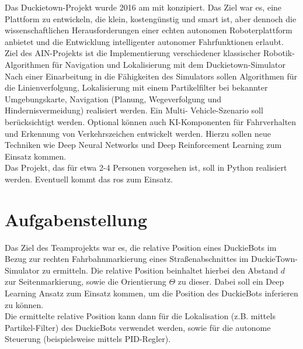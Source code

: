 Das Duckietown-Projekt wurde 2016 am \acf{mit} konzipiert. Das Ziel war es, eine Plattform zu
entwickeln, die klein, kostengünstig und \grqq smart\grqq{} ist, aber dennoch die wissenschaftlichen
Herausforderungen einer echten autonomen Roboterplattform anbietet und die Entwicklung
intelligenter autonomer Fahrfunktionen erlaubt. \cite{duckietown}\\

\noindent Ziel des AIN-Projekts ist die Implementierung verschiedener klassischer Robotik-Algorithmen
für Navigation und Lokalisierung mit dem Duckietown-Simulator\\

\noindent Nach einer Einarbeitung in die Fähigkeiten des Simulators sollen Algorithmen für die
Linienverfolgung, Lokalisierung mit einem Partikelfilter bei bekannter Umgebungskarte,
Navigation (Planung, Wegeverfolgung und Hindernisvermeidung) realisiert werden. Ein Multi-
Vehicle-Szenario soll berücksichtigt werden. Optional können auch KI-Komponenten für
Fahrverhalten und Erkennung von Verkehrszeichen entwickelt werden. Hierzu sollen neue
Techniken wie Deep Neural Networks und Deep Reinforcement Learning zum Einsatz
kommen.\\

\noindent Das Projekt, das für etwa 2-4 Personen vorgesehen ist, soll in Python realisiert werden.
Eventuell kommt das \acf{ros} zum Einsatz.

\newpage

\section{Aufgabenstellung}

Das Ziel des Teamprojekts war es, die relative Position eines DuckieBots im Bezug zur rechten Fahrbahnmarkierung eines Straßenabschnittes im DuckieTown-Simulator zu ermitteln. Die relative Position beinhaltet hierbei den Abstand $d$ zur Seitenmarkierung, sowie die Orientierung $\Theta$ zu dieser. Dabei soll ein Deep Learning Ansatz zum Einsatz kommen, um die Position des DuckieBots inferieren zu können. \\

Die ermittelte relative Position kann dann für die Lokalisation (z.B. mittels Partikel-Filter) des DuckieBots verwendet werden, sowie für die autonome Steuerung (beispielsweise mittels PID-Regler).